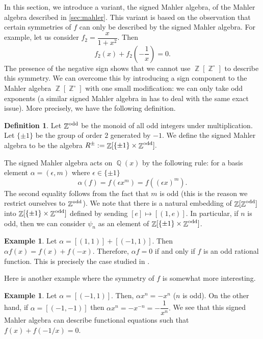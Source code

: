 \documentclass[12t,a4paper]{amsart}
\theoremstyle{definition}
\newtheorem{definition}[thm]{Definition}
\newtheorem{expl}[thm]{Example}
\DeclareMathOperator{\Z}{\mathbb{Z}}
\DeclareMathOperator{\Q}{\mathbb{Q}}
\newcommand{\odd}{{\rm odd}}
\numberwithin{equation}{section}
\begin{document}
{In this section, we introduce a variant, the signed Mahler algebra, of the Mahler algebra described in \cref{sec:mahler}. This variant is based on the observation that certain symmetries of $f$ can only be described by the signed Mahler algebra. For example, let us consider $f_2 = \dfrac{x}{1+x^2}$. Then 
\[ f_2(x)+f_2 \left(-\frac{1}{x} \right)=0.\]
The presence of the negative sign shows that we cannot use $\Z[\Z^{\circ}]$ to describe this symmetry. We can overcome this by introducing a sign component to the Mahler algebra $\Z[\Z^{\circ}]$ with one small modification: we can only take odd exponents (a similar signed Mahler algebra in \cite{hyde2019polynomial} has to deal with the same exact issue). More precisely, we have the following definition. 


\begin{definition}
Let $\Z^{\odd}$ be the monoid of all odd integers under multiplication. Let $\{\pm{1} \}$ be the group of order $2$ generated by $-1.$  We define the signed Mahler algebra to be the algebra $R^{\pm}:=\Z[\{\pm 1\} \times \Z^{\odd}].$ 
\end{definition}
The signed Mahler algebra acts on $\Q(x)$ by the following rule: for a basis element $\alpha = (\epsilon, m)$
where $\epsilon \in \{\pm{1}\}$ 
\[ \alpha(f)=f(\epsilon x^m) = f((\epsilon x)^m). \]
The second equality follows from the fact that $m$ is odd (this is the reason we restrict ourselves to $\Z^{\odd}$). We  note that there is a natural embedding of $\Z[\Z^{\odd}]$ into $\Z[\{\pm 1\} \times \Z^{\odd}]$ defined by sending $[e] \mapsto [(1,e)].$ In particular, if $n$ is odd, then we can consider $\psi_n$ as an element of  $\Z[\{\pm 1\} \times \Z^{\odd}]$. 

\begin{expl}
    Let $\alpha=[(1, 1)]+[(-1, 1)]$. Then $\alpha f (x)=f(x)+f(-x)$. Therefore, $\alpha f = 0$ if and only if $f$ is an odd rational function. This is precisely the case studied in \cite[Section 4.2.1]{hyde2019polynomial}. 
\end{expl}

Here is another example where the symmetry of $f$ is somewhat more interesting. 
\begin{expl}
    Let $\alpha = [(-1, 1)]$. Then, $\alpha x^n = -x^n$ ($n$ is odd). On the other hand, if $\alpha = [(-1, -1)]$ then $\alpha x^n = -x^{-n}= -\dfrac{1}{x^n}.$ We see that this signed Mahler algebra can describe functional equations such that $f(x)+f(-1/x)=0.$
\end{expl}

}
\end{document}
